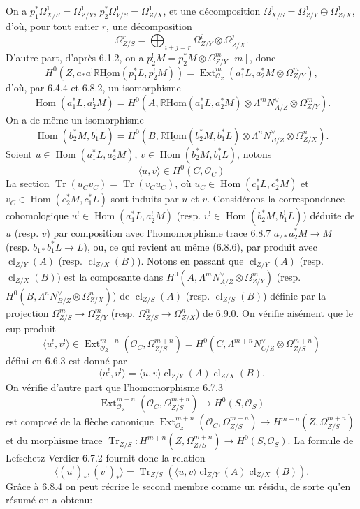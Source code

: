 \documentclass[11pt]{article}
\DeclareMathOperator{\Hom}{Hom}
\DeclareMathOperator{\Ext}{Ext}
\newcommand{\R}{\mathbb{R}}\newcommand{\RHomCore}{\mathbb{R}\mathrm{Hom}}
\providecommand{\RHom}{\RHomCore}
\providecommand{\uRHom}{\underline{\RHom}}
\providecommand{\cl}{\operatorname{cl}}
\providecommand{\OO}{\mathcal{O}}
\providecommand{\RHom}{\RHomCore}
\providecommand{\Hom}{\operatorname{Hom}}
\providecommand{\RHom}{\R\mathcal{H}om}
\providecommand{\R}{\mathrm R}
\providecommand{\cl}{\operatorname{cl}}
\providecommand{\RHom}{\RHomCore}
\providecommand{\Hom}{\operatorname{Hom}}
\providecommand{\cl}{\operatorname{cl}}
\begin{document}
On a $p_1^*\Omega^1_{X/S}=\Omega^1_{Z/Y}$, $p_2^*\Omega^1_{Y/S}=\Omega^1_{Z/X}$, et une décomposition $\Omega^1_{X/S}=\Omega^1_{Z/Y}\oplus\Omega^1_{Z/X}$, d'où, pour tout entier $r$, une décomposition
\begin{equation}
\tag{6.9.0}
\Omega^r_{Z/S}=\bigoplus_{i+j=r}\Omega^i_{Z/Y}\otimes\Omega^j_{Z/X}.
\end{equation}
D'autre part, d'après 6.1.2, on a $p_2^!M=p_2^*M\otimes\Omega^m_{Z/Y}[m]$, donc
\[
H^0(Z,a_*a^!\uRHom(p_1^*L,p_2^!M))=\Ext^m_{\OO_Z}(a_1^*L,a_2^*M\otimes\Omega^m_{Z/Y}),
\]
d'où, par 6.4.4 et 6.8.2, un isomorphisme
\begin{equation}
\tag{6.9.1}
\Hom(a_1^*L,a_2^!M)=H^0(A,\uRHom(a_1^*L,a_2^*M)\otimes\Lambda^m N_{A/Z}^{\vee}\otimes\Omega^m_{Z/Y}).
\end{equation}
On a de même un isomorphisme
\begin{equation}
\tag{6.9.2}
\Hom(b_2^*M,b_1^!L)=H^0(B,\uRHom(b_2^*M,b_1^*L)\otimes\Lambda^n N_{B/Z}^{\vee}\otimes\Omega^n_{Z/X}).
\end{equation}
Soient $u\in\Hom(a_1^*L,a_2^*M)$, $v\in\Hom(b_2^*M,b_1^*L)$, notons
\begin{equation}
\tag{6.9.3}
\langle u,v\rangle\in H^0(C,\OO_C)
\end{equation}
La
section $\operatorname{Tr}(u_Cv_C)=\operatorname{Tr}(v_Cu_C)$, où $u_C\in\Hom(c_1^*L,c_2^*M)$ et $v_C\in\Hom(c_2^*M,c_1^*L)$ sont induits par $u$ et $v$. Considérons la correspondance cohomologique $u^!\in\Hom(a_1^*L,a_2^!M)$ (resp. $v^!\in\Hom(b_2^*M,b_1^!L)$) déduite de $u$ (resp. $v$) par composition avec l'homomorphisme trace 6.8.7 $a_{2*}a_2^*M\to M$ (resp. $b_{1*}b_1^*L\to L$), ou, ce qui revient au même (6.8.6), par produit avec $\cl_{Z/Y}(A)$ (resp. $\cl_{Z/X}(B)$). Notons en passant que $\cl_{Z/Y}(A)$ (resp. $\cl_{Z/X}(B)$) est la composante dans $H^0(A,\Lambda^mN_{A/Z}^{\vee}\otimes\Omega^m_{Z/Y})$ (resp. $H^0(B,\Lambda^nN_{B/Z}^{\vee}\otimes\Omega^n_{Z/X})$) de $\cl_{Z/S}(A)$ (resp. $\cl_{Z/S}(B)$) définie par la projection $\Omega^m_{Z/S}\to\Omega^m_{Z/Y}$ (resp. $\Omega^n_{Z/S}\to\Omega^n_{Z/X}$) de 6.9.0. On vérifie aisément que le cup-produit
\[
\langle u^!,v^!\rangle\in\Ext^{m+n}_{\OO_Z}(\OO_C,\Omega^{m+n}_{Z/S})=H^0(C,\Lambda^{m+n}N_{C/Z}^{\vee}\otimes\Omega^{m+n}_{Z/S})
\]
défini en 6.6.3 est donné par
\begin{equation}
\tag{6.9.4}
\langle u^!,v^!\rangle=\langle u,v\rangle\cl_{Z/Y}(A)\cl_{Z/X}(B).
\end{equation}
On vérifie d'autre part que l'homomorphisme 6.7.3
\[
\Ext^{m+n}_{\OO_Z}(\OO_C,\Omega^{m+n}_{Z/S})\longrightarrow H^0(S,\OO_S)
\]
est composé de la flèche canonique $\Ext^{m+n}_{\OO_Z}(\OO_C,\Omega^{m+n}_{Z/S})\to H^{m+n}(Z,\Omega^{m+n}_{Z/S})$ et du morphisme trace $\operatorname{Tr}_{Z/S}:H^{m+n}(Z,\Omega^{m+n}_{Z/S})\to H^0(S,\OO_S)$. La formule de Lefschetz-Verdier 6.7.2 fournit donc la relation
\begin{equation}
\tag{6.9.5}
\langle (u^!)_*,(v^!)_*\rangle=\operatorname{Tr}_{Z/S}(\langle u,v\rangle\cl_{Z/Y}(A)\cl_{Z/X}(B)).
\end{equation}
Grâce à 6.8.4 on peut récrire le second membre comme un résidu, de sorte qu'en résumé on a obtenu:
\end{document}
